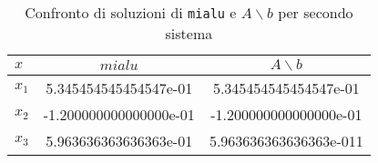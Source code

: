 \begin{table}[ht]
   \centering
   \renewcommand\arraystretch{2}
   \begin{tabular}{| l | c c |}
      \hline
      $x$     & $mialu$                & $A \backslash b$       \\
      \hline
      $x_{1}$ & 5.345454545454547e-01  & 5.345454545454547e-01  \\
      $x_{2}$ & -1.200000000000000e-01 & -1.200000000000000e-01 \\
      $x_{3}$ & 5.963636363636363e-01  & 5.963636363636363e-011 \\
      \hline
   \end{tabular}
   \caption{Confronto di soluzioni di \lstinline{mialu} e $A \backslash b$ per secondo sistema}
   \label{tab:8_2}
\end{table}

